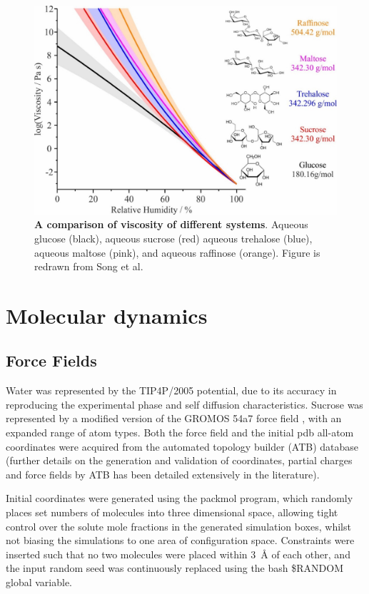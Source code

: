 \begin{figure}
    \centering
    \includegraphics{chapters/water_hopping/figures/image014.jpg}
    \caption{\textbf{A comparison of viscosity of different systems}. Aqueous glucose (black), aqueous sucrose (red) aqueous trehalose (blue), aqueous maltose (pink), and aqueous raffinose (orange).\cite{Song2016a} Figure is redrawn from Song et al.\cite{powerTransitionLiquidSolidlike2013}}
    \label{fig:wat_s6}
\end{figure}

\section{Molecular dynamics}
\subsection{Force Fields}
Water was represented by the TIP4P/2005 \cite{abascalGeneralPurposeModel2005} potential, due to its accuracy in reproducing the experimental phase and self diffusion characteristics. Sucrose was represented by a modified version of the GROMOS 54a7 force field \cite{oostenbrinkBiomolecularForceField2004}, with an expanded range of atom types. Both the force field and the initial pdb all-atom coordinates were acquired from the automated topology builder (ATB) database \cite{koziaraTestingValidationAutomated2014} (further details on the generation \cite{maldeAutomatedForceField2011} and validation \cite{schmidDefinitionTestingGROMOS2011} of coordinates, partial charges and force fields by ATB has been detailed extensively in the literature).

Initial coordinates were generated using the packmol \cite{martinez2009packmol} program, which randomly places set numbers of molecules into three dimensional space, allowing tight control over the solute mole fractions in the generated simulation boxes, whilst not biasing the simulations to one area of configuration space. Constraints were inserted such that no two molecules were placed within \SI{3}{\angstrom} of each other, and the input random seed was continuously replaced using the bash \$RANDOM global variable. 


